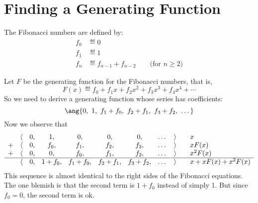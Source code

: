 \documentclass[quiz]{mcs}
\begin{document}
\iffalse

\section{Convolution Counting}
Let
\begin{align*}
A(x) & = \sum_{n=0}^{\infty} a_n x^n, & B(x) & =
\sum_{n=0}^{\infty} b_n x^n, & C(x) & = A(x) \cdot B(x) =
\sum_{n=0}^{\infty} c_n x^n.
\end{align*}
Then
\[
c_n = a_0 b_n + a_1 b_{n-1} + a_2 b_{n-2} + \cdots + a_n b_0.
\]

\begin{mathrule*}[Convolution Rule]
  Let $A(x)$ be the generating function for selecting items from set
  $\mathcal{A}$, and let $B(x)$ be the generating function for selecting
  items from set $\mathcal{B}$.  If $\mathcal{A}$ and $\mathcal{B}$ are
  disjoint, then the generating function for selecting items from the
  union $\mathcal{A} \cup \mathcal{B}$ is the product $A(x) \cdot B(x)$.
\end{mathrule*}
\fi


\section{Finding a Generating Function}
The Fibonacci numbers are defined by:
\begin{align*}
f_0 & \eqdef 0 \\
f_1 & \eqdef 1 \\
f_n & \eqdef f_{n-1} + f_{n-2} \qquad \text{(for $n \geq 2$)}
\end{align*}

Let $F$ be the generating function for the Fibonacci numbers,
that is,
\[
F(x) \eqdef f_0 + f_1 x + f_2 x^2 + f_3 x^3 + f_4 x^4 + \cdots
\]
So we need to derive a generating function whose series has
coefficients:
\[
\ang{0,\ 1,\ f_1 + f_0,\ f_2 + f_1,\ f_3 + f_2,\ \dots}
\]
Now we observe that
\[
\begin{array}{ccccccccccl}
  & \langle & 0, & 1, & 0, & 0, & 0, & \dots & \rangle
    &     & x \\
+ & \langle & 0, & f_0, & f_1, & f_2, & f_3, & \dots & \rangle
    &     & x F(x) \\
+ & \langle & 0, & 0, & f_0, & f_1, & f_2, & \dots & \rangle
    &     & x^2 F(x) \\ \hline
  & \langle & 0, & 1 + f_0, & f_1 + f_0, & f_2 + f_1, & f_3 + f_2, & \dots & \rangle
    &     & x + x F(x) + x^2 F(x) \\
\end{array}
\]
%
This sequence is almost identical to the right sides of the
Fibonacci equations.  The one blemish is that the second term is
$1 + f_0$ instead of simply 1.  But since $f_0 = 0$, the second
term is ok.
\end{document}
